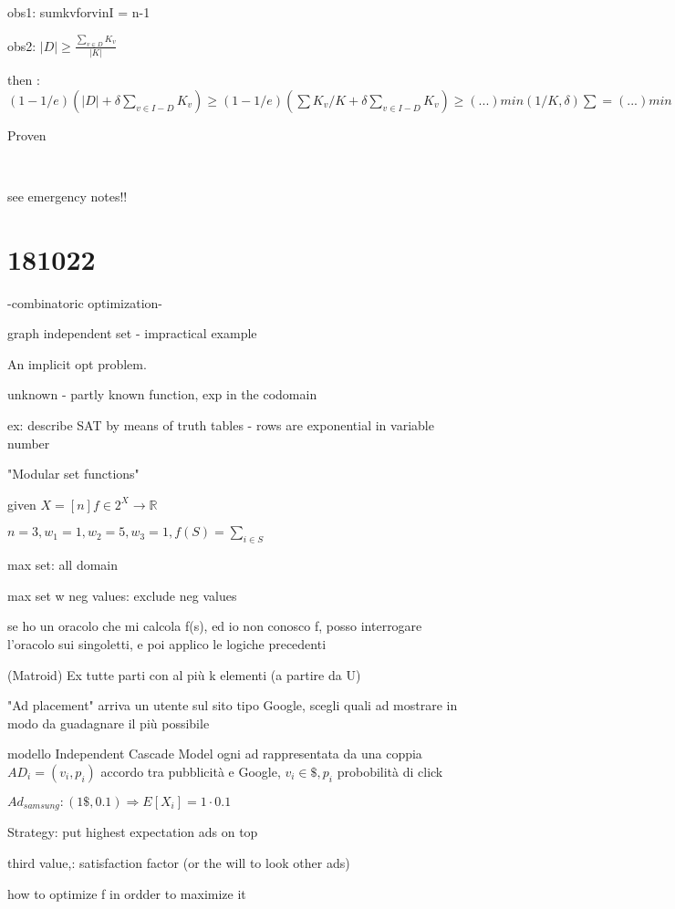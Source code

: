 \documentclass{report}
\begin{document}
	obs1: sumkvforvinI = n-1
	
	obs2: $|D| \geq \frac{\sum_{v \in D}K_v}{|K|}$
	
	then : $(1 - 1/e)(|D| + \delta\sum_{v \in I-D}K_v) \geq (1 - 1/e)(\sum K_v/K + \delta\sum_{v \in I-D}K_v) \geq (...)min(1/K, \delta)\sum = (...)min(...)(n-1)$
	
	Proven
	
	\
	
	see emergency notes!!
	
	\section{181022}
	
	-combinatoric optimization-
	
	graph independent set - impractical example
	
	An implicit opt problem.
	
	unknown - partly known function, exp in the codomain
	
	ex: describe SAT by means of truth tables - rows are exponential in variable number
	
	"Modular set functions"
	
	given $X=[n] f \in 2^X \to \mathbb{R}$
	
	$n=3, w_1 = 1, w_2 = 5, w_3 = 1, f(S)=\sum_{i \in S}$
	
	max  set: all domain
	
	max set w neg values: exclude neg values
	
	se ho un oracolo che mi calcola f(s), ed io non conosco f, posso interrogare l'oracolo sui singoletti, e poi applico le logiche precedenti
	
	(Matroid) Ex tutte parti con al più k elementi (a partire da U)
	
	"Ad placement"
	arriva un utente sul sito tipo Google, scegli quali ad mostrare in modo da guadagnare il più possibile
	
	modello Independent Cascade Model
	ogni ad rappresentata da una coppia $AD_i = (v_i, p_i)$ accordo tra pubblicità e Google, $v_i \in \$, p_i$ probobilità di click
	
	$Ad_{samsung} : (1\$, 0.1) \Rightarrow E[X_i] = 1 \cdot 0.1$
	
	Strategy: put highest expectation ads on top
	
	third value,: satisfaction factor (or the will to look other ads)
	
	how to optimize f in ordder to maximize it
	
\end{document}
